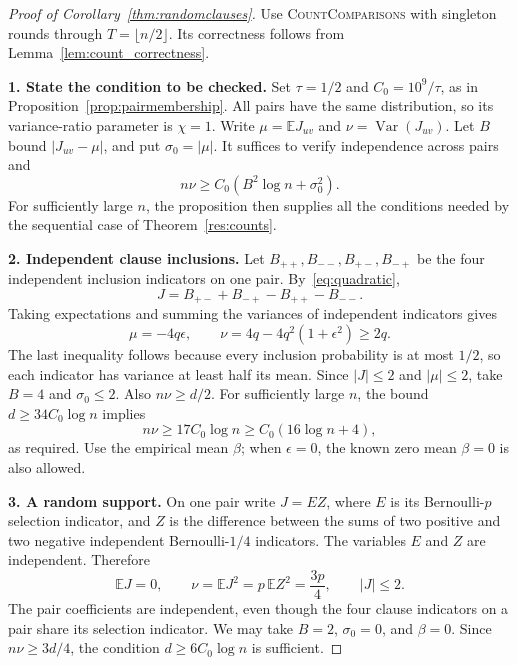 \documentclass[11pt,a4paper]{article}
\theoremstyle{definition}
\theoremstyle{remark}
\newcommand{\E}{\mathbb E}
\begin{document}
\begin{proof}[Proof of Corollary~\ref{thm:randomclauses}]
Use \textnormal{\textsc{CountComparisons}} with singleton rounds through
$T=\lfloor n/2\rfloor$. Its correctness follows from
Lemma~\ref{lem:count_correctness}.

\par\medskip\noindent\textbf{1. State the condition to be checked.}
Set $\tau=1/2$ and $C_0=10^9/\tau$, as in
Proposition~\ref{prop:pairmembership}. All pairs have the same distribution,
so its variance-ratio parameter is $\chi=1$.
Write $\mu=\E J_{uv}$ and $\nu=\operatorname{Var}(J_{uv})$.
Let $B$ bound $|J_{uv}-\mu|$, and put $\sigma_0=|\mu|$.
It suffices to verify independence across pairs and
\[
 n\nu\ge C_0(B^2\log n+\sigma_0^2).
\]
For sufficiently large $n$, the proposition then supplies all the
conditions needed by the sequential case of Theorem~\ref{res:counts}.

\par\medskip\noindent\textbf{2. Independent clause inclusions.}
Let $B_{++},B_{--},B_{+-},B_{-+}$ be the four independent inclusion
indicators on one pair. By~\eqref{eq:quadratic},
\[
 J=B_{+-}+B_{-+}-B_{++}-B_{--}.
\]
Taking expectations and summing the variances of independent indicators gives
\[
 \mu=-4q\epsilon,\qquad
 \nu=4q-4q^2(1+\epsilon^2)\ge2q.
\]
The last inequality follows because every inclusion probability is at
most $1/2$, so each indicator has variance at least half its mean.
Since $|J|\le2$ and $|\mu|\le2$, take $B=4$ and $\sigma_0\le2$.
Also $n\nu\ge d/2$.
For sufficiently large $n$, the bound $d\ge34C_0\log n$ implies
\[
 n\nu\ge17C_0\log n\ge C_0(16\log n+4),
\]
as required. Use the empirical mean $\beta$; when $\epsilon=0$,
the known zero mean $\beta=0$ is also allowed.

\par\medskip\noindent\textbf{3. A random support.}
On one pair write $J=EZ$, where $E$ is its Bernoulli-$p$ selection
indicator, and $Z$ is the difference between the sums of two positive
and two negative independent Bernoulli-$1/4$ indicators.
The variables $E$ and $Z$ are independent. Therefore
\[
 \E J=0,\qquad
 \nu=\E J^2=p\,\E Z^2=\frac{3p}{4},\qquad
 |J|\le2.
\]
The pair coefficients are independent, even though the four clause
indicators on a pair share its selection indicator.
We may take $B=2$, $\sigma_0=0$, and $\beta=0$.
Since $n\nu\ge3d/4$, the condition $d\ge6C_0\log n$ is sufficient.


\end{proof}
\end{document}
